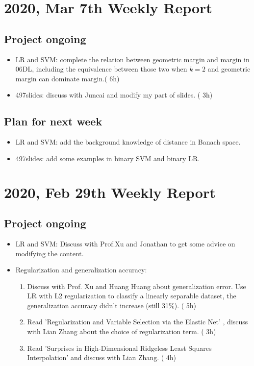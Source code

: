 \documentclass[10pt]{amsart}
\begin{document}
\section{2020, Mar 7th Weekly Report }
\subsection{Project ongoing}
\begin{itemize}
	\item {\color{red} LR and SVM: complete the relation between geometric margin and margin in 06DL, including the equivalence between those two when $k = 2$ and geometric margin can dominate margin.}({\color{blue} 6h})
	\item {\color{red} 497slides: discuss with Juncai and modify my part of slides. } ({\color{blue} 3h})
\end{itemize}
\subsection{Plan for next week}
\begin{itemize}
	\item LR and SVM: add the background knowledge of distance in Banach space.
	\item 497slides: add some examples in binary SVM and binary LR.
\end{itemize}

\section{2020, Feb 29th Weekly Report }
\subsection{Project ongoing}
\begin{itemize}
	\item LR and SVM: Discuss with Prof.Xu and Jonathan to get some advice on modifying the content.
	\item Regularization and generalization accuracy: 
	\begin{enumerate}
		\item Discuss with Prof. Xu and Huang Huang about generalization error. Use LR with L2 regularization to classify a linearly separable dataset, the generalization accuracy didn't increase (still 31\%). ({\color{blue} 5h})
		\item Read 'Regularization and Variable Selection via the Elastic Net' , discuss with Lian Zhang about the choice of regularization term. ({\color{blue} 3h})
		\item Read 'Surprises in High-Dimensional Ridgeless Least Squares Interpolation' and discuss with Lian Zhang. ({\color{blue} 4h})
	\end{enumerate}
\end{itemize}
\end{document}
